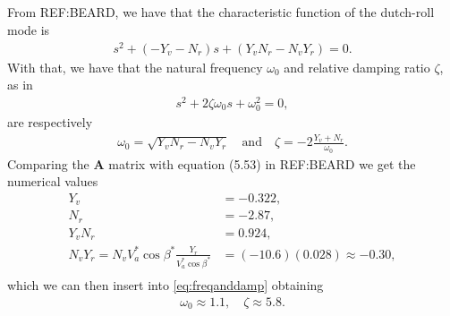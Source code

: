 \subsection{}
From REF:BEARD, we have that the characteristic function of the dutch-roll mode is
\begin{equation}\begin{aligned}
s^2 + (-Y_v - N_r)s + (Y_vN_r - N_vY_r) = 0.
\end{aligned}\end{equation}
With that, we have that the natural frequency $\omega_0$ and relative damping ratio $\zeta$, as in
\begin{equation}\begin{aligned}
s^2 + 2\zeta \omega_0 s + \omega_0^2 = 0,
\end{aligned}\end{equation}
are respectively
\begin{equation}\begin{aligned}
\label{eq:freqanddamp}
\omega_0 = \sqrt{Y_v N_r - N_v Y_r} \quad \text{and} \quad \zeta = -2\frac{Y_v + N_r}{\omega_0}.
\end{aligned}\end{equation}
Comparing the $\mathbf{A}$ matrix with equation (5.53) in REF:BEARD we get the numerical values
\begin{align}
Y_v &= -0.322, \\
N_r &= -2.87, \\
Y_v N_r &= 0.924, \\
N_v Y_r = N_v V_a^* \cos \beta^* \frac{Y_r}{V_a^* \cos \beta^*} &= (-10.6)(0.028) \approx -0.30, \\
\end{align}
which we can then insert into \eqref{eq:freqanddamp} obtaining
\begin{equation}\begin{aligned}
\omega_0 \approx 1.1, \quad \zeta \approx 5.8.
\end{aligned}\end{equation}



